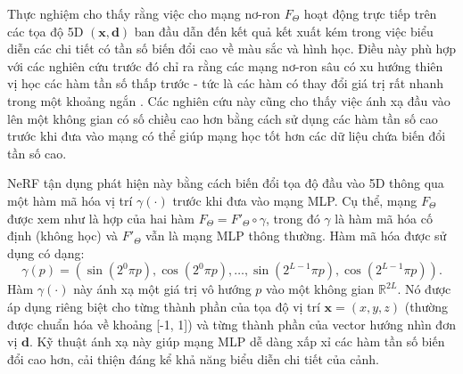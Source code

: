 Thực nghiệm cho thấy rằng việc cho mạng nơ-ron $F_{\Theta}$ hoạt động trực tiếp trên các tọa độ 5D $(\mathbf{x}, \mathbf{d})$ ban đầu dẫn đến kết quả kết xuất kém trong việc biểu diễn các chi tiết có tần số biến đổi cao về màu sắc và hình học. Điều này phù hợp với các nghiên cứu trước đó chỉ ra rằng các mạng nơ-ron sâu có xu hướng thiên vị học các hàm tần số thấp trước - tức là các hàm có thay đổi giá trị rất nhanh trong một khoảng ngắn \cite{Rahaman18Spectral}. Các nghiên cứu này cũng cho thấy việc ánh xạ đầu vào lên một không gian có số chiều cao hơn bằng cách sử dụng các hàm tần số cao trước khi đưa vào mạng có thể giúp mạng học tốt hơn các dữ liệu chứa biến đổi tần số cao.

NeRF tận dụng phát hiện này bằng cách biến đổi tọa độ đầu vào 5D thông qua một hàm mã hóa vị trí $\gamma(\cdot)$ trước khi đưa vào mạng MLP. Cụ thể, mạng $F_\Theta$ được xem như là hợp của hai hàm $F_\Theta = F'_\Theta \circ \gamma$, trong đó $\gamma$ là hàm mã hóa cố định (không học) và $F'_\Theta$ vẫn là mạng MLP thông thường. Hàm mã hóa được sử dụng có dạng:
\begin{equation} \label{eq:positional_encoding}
\gamma(p) = \left( \sin(2^0 \pi p), \cos(2^0 \pi p), \dots, \sin(2^{L-1} \pi p), \cos(2^{L-1} \pi p) \right).
\end{equation}
Hàm $\gamma(\cdot)$ này ánh xạ một giá trị vô hướng $p$ vào một không gian $\mathbb{R}^{2L}$. Nó được áp dụng riêng biệt cho từng thành phần của tọa độ vị trí $\mathbf{x} = (x, y, z)$ (thường được chuẩn hóa về khoảng [-1, 1]) và từng thành phần của vector hướng nhìn đơn vị $\mathbf{d}$. Kỹ thuật ánh xạ này giúp mạng MLP dễ dàng xấp xỉ các hàm tần số biến đổi cao hơn, cải thiện đáng kể khả năng biểu diễn chi tiết của cảnh.




